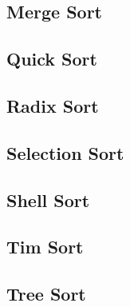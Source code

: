 \documentclass{article}
\begin{document}
\subsection{Merge Sort}
\subsection{Quick Sort}
\subsection{Radix Sort}
\subsection{Selection Sort}
\subsection{Shell Sort}
\subsection{Tim Sort}
\subsection{Tree Sort}
\end{document}
